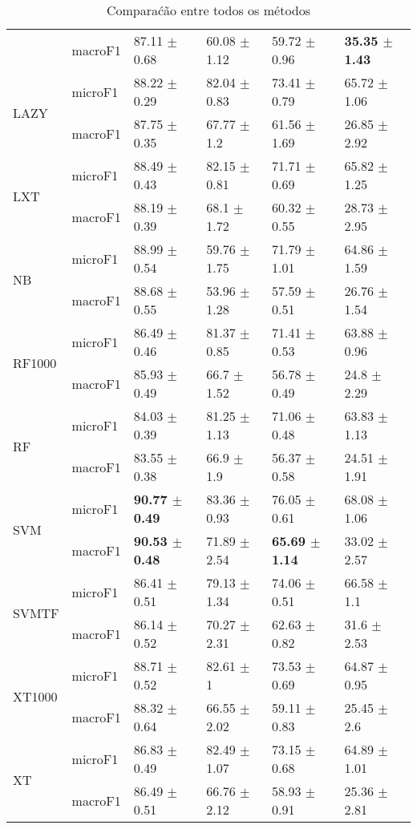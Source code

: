 \documentclass[]{article}
\begin{document}
\begin{table}[ht]
\begin{tabular}{llllll}
   & macroF1 & 87.11 $\pm$  0.68 & 60.08 $\pm$  1.12 & 59.72 $\pm$  0.96 & \bf{35.35 $\pm$  1.43} \\ 
   \cline{3-6}\multirow{2}{*}{LAZY} & microF1 & 88.22 $\pm$  0.29 & 82.04 $\pm$  0.83 & 73.41 $\pm$  0.79 & 65.72 $\pm$  1.06 \\ 
   & macroF1 & 87.75 $\pm$  0.35 & 67.77 $\pm$  1.2 & 61.56 $\pm$  1.69 & 26.85 $\pm$  2.92 \\ 
   \cline{3-6}\multirow{2}{*}{LXT} & microF1 & 88.49 $\pm$  0.43 & 82.15 $\pm$  0.81 & 71.71 $\pm$  0.69 & 65.82 $\pm$  1.25 \\ 
   & macroF1 & 88.19 $\pm$  0.39 & 68.1 $\pm$  1.72 & 60.32 $\pm$  0.55 & 28.73 $\pm$  2.95 \\ 
   \cline{3-6}\multirow{2}{*}{NB} & microF1 & 88.99 $\pm$  0.54 & 59.76 $\pm$  1.75 & 71.79 $\pm$  1.01 & 64.86 $\pm$  1.59 \\ 
   & macroF1 & 88.68 $\pm$  0.55 & 53.96 $\pm$  1.28 & 57.59 $\pm$  0.51 & 26.76 $\pm$  1.54 \\ 
   \cline{3-6}\multirow{2}{*}{RF1000} & microF1 & 86.49 $\pm$  0.46 & 81.37 $\pm$  0.85 & 71.41 $\pm$  0.53 & 63.88 $\pm$  0.96 \\ 
   & macroF1 & 85.93 $\pm$  0.49 & 66.7 $\pm$  1.52 & 56.78 $\pm$  0.49 & 24.8 $\pm$  2.29 \\ 
   \cline{3-6}\multirow{2}{*}{RF} & microF1 & 84.03 $\pm$  0.39 & 81.25 $\pm$  1.13 & 71.06 $\pm$  0.48 & 63.83 $\pm$  1.13 \\ 
   & macroF1 & 83.55 $\pm$  0.38 & 66.9 $\pm$  1.9 & 56.37 $\pm$  0.58 & 24.51 $\pm$  1.91 \\ 
   \cline{3-6}\multirow{2}{*}{SVM} & microF1 & \bf{90.77 $\pm$  0.49} & 83.36 $\pm$  0.93 & 76.05 $\pm$  0.61 & 68.08 $\pm$  1.06 \\ 
   & macroF1 & \bf{90.53 $\pm$  0.48} & 71.89 $\pm$  2.54 & \bf{65.69 $\pm$  1.14} & 33.02 $\pm$  2.57 \\ 
   \cline{3-6}\multirow{2}{*}{SVMTF} & microF1 & 86.41 $\pm$  0.51 & 79.13 $\pm$  1.34 & 74.06 $\pm$  0.51 & 66.58 $\pm$  1.1 \\ 
   & macroF1 & 86.14 $\pm$  0.52 & 70.27 $\pm$  2.31 & 62.63 $\pm$  0.82 & 31.6 $\pm$  2.53 \\ 
   \cline{3-6}\multirow{2}{*}{XT1000} & microF1 & 88.71 $\pm$  0.52 & 82.61 $\pm$  1 & 73.53 $\pm$  0.69 & 64.87 $\pm$  0.95 \\ 
   & macroF1 & 88.32 $\pm$  0.64 & 66.55 $\pm$  2.02 & 59.11 $\pm$  0.83 & 25.45 $\pm$  2.6 \\ 
   \cline{3-6}\multirow{2}{*}{XT} & microF1 & 86.83 $\pm$  0.49 & 82.49 $\pm$  1.07 & 73.15 $\pm$  0.68 & 64.89 $\pm$  1.01 \\ 
   & macroF1 & 86.49 $\pm$  0.51 & 66.76 $\pm$  2.12 & 58.93 $\pm$  0.91 & 25.36 $\pm$  2.81 \\ 
   \cline{3-6}\end{tabular}
\caption{Comparaćão entre todos os métodos} 
\end{table}
\end{document}
